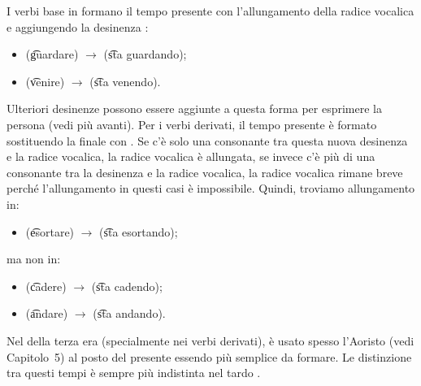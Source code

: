 I verbi base in \quenya formano il tempo presente con l'allungamento della
radice vocalica e aggiungendo la desinenza :
\begin{itemize}
  \item {} (\t{guardare}) $\rightarrow$  (\t{sta guardando});
  \item {} (\t{venire}) $\rightarrow$  (\t{sta venendo}).
\end{itemize}
Ulteriori desinenze possono essere aggiunte a questa forma per esprimere la
persona (vedi più avanti).
Per i verbi derivati, il tempo presente è formato sostituendo la  finale
con . Se c'è solo una consonante tra questa nuova desinenza 
e la radice vocalica, la radice vocalica è allungata, se invece c'è più di una
consonante tra la desinenza e la radice vocalica, la radice vocalica rimane
breve perché l'allungamento in questi casi è impossibile.
Quindi, troviamo allungamento in:
\begin{itemize}
  \item {} (\t{esortare}) $\rightarrow$  (\t{sta esortando});
\end{itemize}
ma non in:
\begin{itemize}
  \item {} (\t{cadere}) $\rightarrow$  (\t{sta cadendo});
  \item {} (\t{andare}) $\rightarrow$  (\t{sta andando}).
\end{itemize}
Nel \quenya della terza era (specialmente nei verbi derivati),
è usato spesso l'Aoristo (vedi Capitolo~5) al posto del presente essendo più
semplice da formare.
Le distinzione tra questi tempi è sempre più indistinta nel tardo \quenya.

